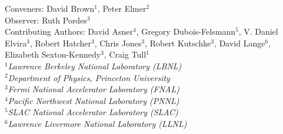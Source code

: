 

\begin{center}
{\large Conveners: David Brown$^1$, Peter Elmer$^2$\\
Observer: Ruth Pordes$^3$\\
Contributing Authors: David Asner$^4$, Gregory Dubois-Felsmann$^5$, V. Daniel Elvira$^3$, Robert Hatcher$^3$, Chris Jones$^3$, Robert Kutschke$^3$, David Lange$^6$, Elizabeth Sexton-Kennedy$^3$, Craig Tull$^1$}\\
\bigskip
$^1${\it Lawrence Berkeley National Laboratory (LBNL)}\\
$^2${\it Department of Physics, Princeton University}\\
$^3${\it Fermi National Accelerator Laboratory (FNAL)}\\
$^4${\it Pacific Northwest National Laboratory (PNNL)}\\
$^5${\it SLAC National Accelerator Laboratory (SLAC)}\\
$^6${\it Lawrence Livermore National Laboratory (LLNL)}\\
\end{center}
\bigskip




